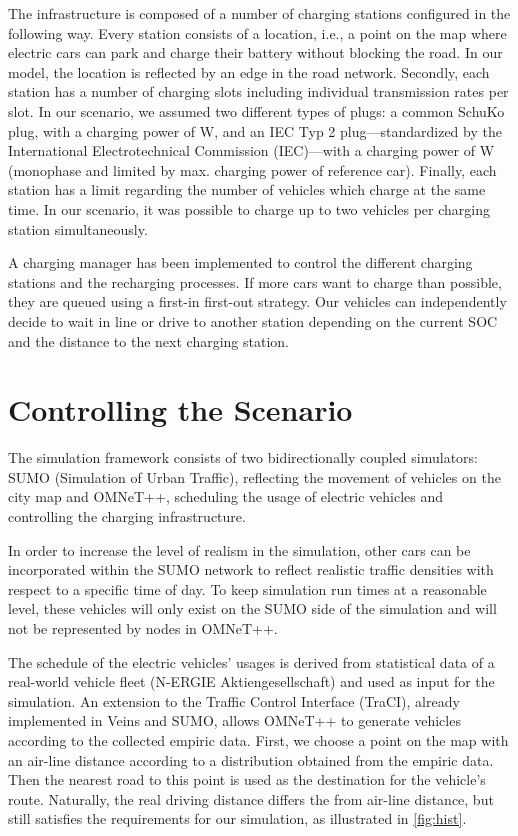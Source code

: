 \documentclass[conference]{IEEEtran}
\begin{document}
The infrastructure is composed of a number of charging stations configured in the following way.
Every station consists of a location, i.e., a point on the map where electric cars can park and charge their battery without blocking the road.
In our model, the location is reflected by an edge in the road network.
Secondly, each station has a number of charging slots including individual transmission rates per slot.
In our scenario, we assumed two different types of plugs: a common SchuKo plug, with a charging power of \unit[2300]{W}, and an IEC Typ 2 plug---standardized by the International Electrotechnical Commission (IEC)---with a charging power of \unit[3600]{W} (monophase and limited by max. charging power of reference car).
Finally, each station has a limit regarding the number of vehicles which charge at the same time.
In our scenario, it was possible to charge up to two vehicles per charging station simultaneously.

A charging manager has been implemented to control the different charging stations and the recharging processes.
If more cars want to charge than possible, they are queued using a first-in first-out strategy.
Our vehicles can independently decide to wait in line or drive to another station depending on the current SOC and the distance to the next charging station.

\section{Controlling the Scenario}

The simulation framework consists of two bidirectionally coupled simulators:
SUMO (Simulation of Urban Traffic), reflecting the movement of vehicles on the city map and OMNeT++, scheduling the usage of electric vehicles and controlling the charging infrastructure.

In order to increase the level of realism in the simulation, other cars can be incorporated within the SUMO network to reflect realistic traffic densities with respect to a specific time of day.
To keep simulation run times at a reasonable level, these vehicles will only exist on the SUMO side of the simulation and will not be represented by nodes in OMNeT++.

The schedule of the electric vehicles' usages is derived from statistical data of a real-world vehicle fleet (N-ERGIE Aktiengesellschaft) and used as input for the simulation.
An extension to the Traffic Control Interface (TraCI), already implemented in Veins and SUMO, allows OMNeT++ to generate vehicles according to the collected empiric data.
First, we choose a point on the map with an air-line distance according to a distribution obtained from the empiric data.
Then the nearest road to this point is used as the destination for the vehicle's route.
Naturally, the real driving distance differs the from air-line distance, but still satisfies the requirements for our simulation, as illustrated in \cref{fig:hist}.
\end{document}
